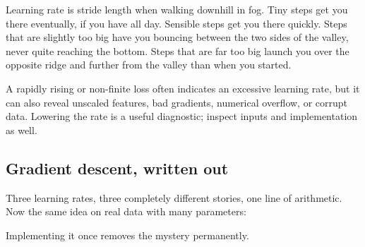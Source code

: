 \begin{mlfigure}
\end{mlfigure}

\begin{analogy}
Learning rate is stride length when walking downhill in fog. Tiny steps get you there eventually, if you have all day. Sensible steps get you there quickly. Steps that are slightly too big have you bouncing between the two sides of the valley, never quite reaching the bottom. Steps that are far too big launch you over the opposite ridge and further from the valley than when you started.
\end{analogy}

\begin{keyidea}
A rapidly rising or non-finite loss often indicates an excessive learning rate, but it can also reveal unscaled features, bad gradients, numerical overflow, or corrupt data. Lowering the rate is a useful diagnostic; inspect inputs and implementation as well.
\end{keyidea}

\subsection{Gradient descent, written out}

Three learning rates, three completely different stories, one line of arithmetic. Now the same idea on real data with many parameters:

Implementing it once removes the mystery permanently.

